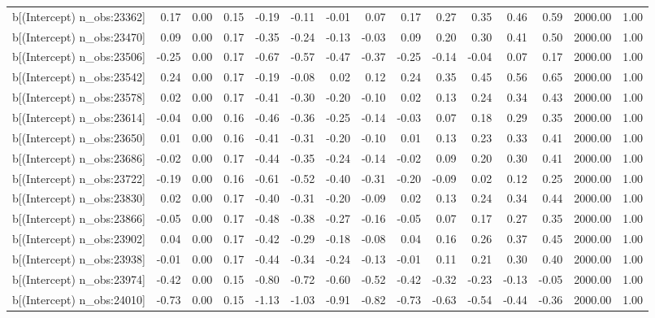 \begin{table}[ht]
\begin{tabular}{rrrrrrrrrrrrrrr}
  b[(Intercept) n\_obs:23362] & 0.17 & 0.00 & 0.15 & -0.19 & -0.11 & -0.01 & 0.07 & 0.17 & 0.27 & 0.35 & 0.46 & 0.59 & 2000.00 & 1.00 \\ 
  b[(Intercept) n\_obs:23470] & 0.09 & 0.00 & 0.17 & -0.35 & -0.24 & -0.13 & -0.03 & 0.09 & 0.20 & 0.30 & 0.41 & 0.50 & 2000.00 & 1.00 \\ 
  b[(Intercept) n\_obs:23506] & -0.25 & 0.00 & 0.17 & -0.67 & -0.57 & -0.47 & -0.37 & -0.25 & -0.14 & -0.04 & 0.07 & 0.17 & 2000.00 & 1.00 \\ 
  b[(Intercept) n\_obs:23542] & 0.24 & 0.00 & 0.17 & -0.19 & -0.08 & 0.02 & 0.12 & 0.24 & 0.35 & 0.45 & 0.56 & 0.65 & 2000.00 & 1.00 \\ 
  b[(Intercept) n\_obs:23578] & 0.02 & 0.00 & 0.17 & -0.41 & -0.30 & -0.20 & -0.10 & 0.02 & 0.13 & 0.24 & 0.34 & 0.43 & 2000.00 & 1.00 \\ 
  b[(Intercept) n\_obs:23614] & -0.04 & 0.00 & 0.16 & -0.46 & -0.36 & -0.25 & -0.14 & -0.03 & 0.07 & 0.18 & 0.29 & 0.35 & 2000.00 & 1.00 \\ 
  b[(Intercept) n\_obs:23650] & 0.01 & 0.00 & 0.16 & -0.41 & -0.31 & -0.20 & -0.10 & 0.01 & 0.13 & 0.23 & 0.33 & 0.41 & 2000.00 & 1.00 \\ 
  b[(Intercept) n\_obs:23686] & -0.02 & 0.00 & 0.17 & -0.44 & -0.35 & -0.24 & -0.14 & -0.02 & 0.09 & 0.20 & 0.30 & 0.41 & 2000.00 & 1.00 \\ 
  b[(Intercept) n\_obs:23722] & -0.19 & 0.00 & 0.16 & -0.61 & -0.52 & -0.40 & -0.31 & -0.20 & -0.09 & 0.02 & 0.12 & 0.25 & 2000.00 & 1.00 \\ 
  b[(Intercept) n\_obs:23830] & 0.02 & 0.00 & 0.17 & -0.40 & -0.31 & -0.20 & -0.09 & 0.02 & 0.13 & 0.24 & 0.34 & 0.44 & 2000.00 & 1.00 \\ 
  b[(Intercept) n\_obs:23866] & -0.05 & 0.00 & 0.17 & -0.48 & -0.38 & -0.27 & -0.16 & -0.05 & 0.07 & 0.17 & 0.27 & 0.35 & 2000.00 & 1.00 \\ 
  b[(Intercept) n\_obs:23902] & 0.04 & 0.00 & 0.17 & -0.42 & -0.29 & -0.18 & -0.08 & 0.04 & 0.16 & 0.26 & 0.37 & 0.45 & 2000.00 & 1.00 \\ 
  b[(Intercept) n\_obs:23938] & -0.01 & 0.00 & 0.17 & -0.44 & -0.34 & -0.24 & -0.13 & -0.01 & 0.11 & 0.21 & 0.30 & 0.40 & 2000.00 & 1.00 \\ 
  b[(Intercept) n\_obs:23974] & -0.42 & 0.00 & 0.15 & -0.80 & -0.72 & -0.60 & -0.52 & -0.42 & -0.32 & -0.23 & -0.13 & -0.05 & 2000.00 & 1.00 \\ 
  b[(Intercept) n\_obs:24010] & -0.73 & 0.00 & 0.15 & -1.13 & -1.03 & -0.91 & -0.82 & -0.73 & -0.63 & -0.54 & -0.44 & -0.36 & 2000.00 & 1.00 \\ 

\end{tabular}
\end{table}
